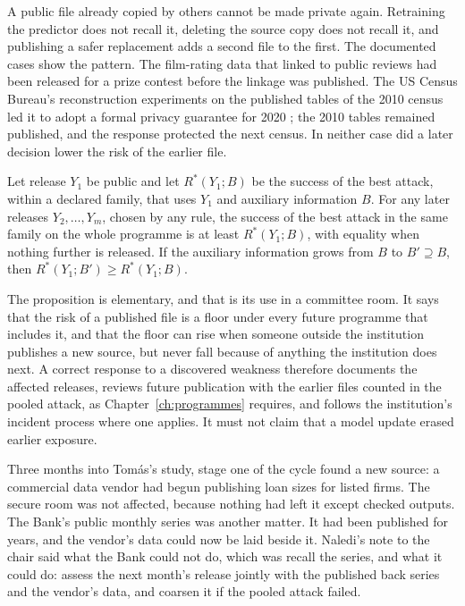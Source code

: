 A public file already copied by others cannot be made private again. Retraining the
predictor does not recall it, deleting the source copy does not recall it, and publishing a safer
replacement adds a second file to the first. The documented cases show the pattern. The film-rating data that \citet{narayanan2008} linked to public reviews had been released
for a prize contest before the linkage was published. The US Census Bureau's reconstruction
experiments on the published tables of the 2010 census led it to adopt a formal privacy
guarantee for 2020 \citep{garfinkel2019,abowd2022}; the 2010 tables remained
published, and the response protected the next census. In neither case did a later decision
lower the risk of the earlier file.

\begin{proposition}\label{c18:prop-floor}
Let release $Y_1$ be public and let $R^\ast(Y_1;B)$
be the success of the best attack, within a declared family, that uses $Y_1$ and auxiliary information $B$.
For any later releases $Y_2,\dots,Y_m$, chosen by any rule, the success of the best attack in the same family
on the whole programme is at least $R^\ast(Y_1;B)$, with equality when nothing further is released. If the
auxiliary information grows from $B$ to $B'\supseteq B$, then $R^\ast(Y_1;B')\ge R^\ast(Y_1;B)$.
\end{proposition}

The proposition is elementary, and that is its use in a committee room. It says that the
risk of a published file is a floor under every future programme that includes it, and that the
floor can rise when someone outside the institution publishes a new source, but never fall
because of anything the institution does next. A correct response to a discovered weakness
therefore documents the affected releases, reviews future publication with the earlier files
counted in the pooled attack, as Chapter~\ref{ch:programmes} requires, and follows the institution's incident
process where one applies. It must not claim that a model update erased earlier exposure.

Three months into Tom\'as's study, stage one of the cycle found a new source: a commercial data vendor had begun publishing loan sizes for listed firms. The secure room was not
affected, because nothing had left it except checked outputs. The Bank's public monthly
series was another matter. It had been published for years, and the vendor's data could
now be laid beside it. Naledi's note to the chair said what the Bank could not do, which
was recall the series, and what it could do: assess the next month's release jointly with the
published back series and the vendor's data, and coarsen it if the pooled attack failed.

